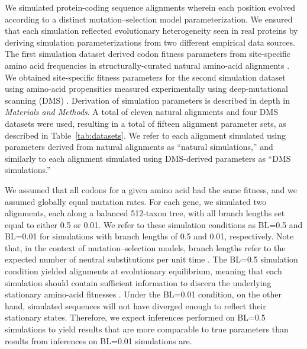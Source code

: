 \documentclass[11pt]{article}
\begin{document}
We simulated protein-coding sequence alignments wherein each position evolved according to a distinct mutation--selection model parameterization. We ensured that each simulation reflected evolutionary heterogeneity seen in real proteins by deriving simulation parameterizations from two different empirical data sources. The first simulation dataset derived codon fitness parameters from site-specific amino acid frequencies in structurally-curated natural amino-acid alignments \citep{Ramseyetal2011}. We obtained site-specific fitness parameters for the second simulation dataset using amino-acid propensities measured experimentally using deep-mutational scanning (DMS) \citep{Firnbergetal2014,ThyagarajanBloom2014,Bloom2014a,Doudetal2015,Stiffleretal2015,Kitzmanetal2015}. Derivation of simulation parameters is described in depth in \emph{Materials and Methods}. A total of eleven natural alignments and four DMS datasets were used, resulting in a total of fifteen alignment parameter sets, as described in Table~\ref{tab:datasets}. We refer to each alignment simulated using parameters derived from natural alignments as ``natural simulations,'' and similarly to each alignment simulated using DMS-derived parameters as ``DMS simulations.''

We assumed that all codons for a given amino acid had the same fitness, and we assumed globally equal mutation rates. For each gene, we simulated two alignments, each along a balanced 512-taxon tree, with all branch lengths set equal to either 0.5 or 0.01. We refer to these simulation conditions as BL=0.5 and BL=0.01 for simulations with branch lengths of 0.5 and 0.01, respectively. Note that, in the context of mutation--selection models, branch lengths refer to the expected number of neutral substitutions per unit time \citep{pyvolve}. The BL=0.5 simulation condition yielded alignments at evolutionary equilibrium, meaning that each simulation should contain sufficient information to discern the underlying stationary amino-acid fitnesses \citep{SpielmanWanWilke2015}. Under the BL=0.01 condition, on the other hand, simulated sequences will not have diverged enough to reflect their stationary states. Therefore, we expect inferences performed on BL=0.5 simulations to yield results that are more comparable to true parameters than results from inferences on BL=0.01 simulations are.
\end{document}
